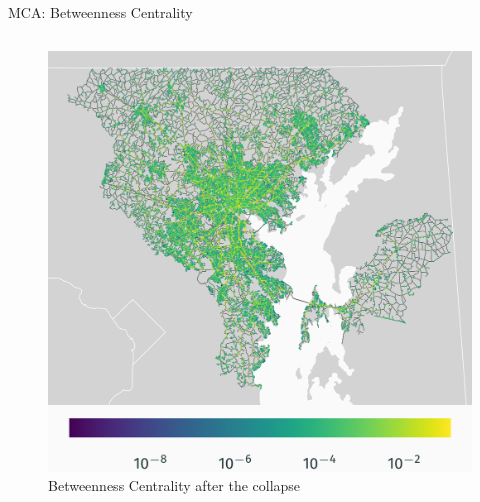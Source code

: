 \documentclass{beamer}
\numberwithin{figure}{section} %
\numberwithin{table}{section} %
\begin{document}
\begin{frame}{MCA: Betweenness Centrality}
\begin{columns}
        \begin{column}{0.33\textwidth}
            \begin{figure}
                \centering
                \includegraphics[width=\textwidth]{maps/betweenness_wo_bridge.png}
                {\scriptsize Betweenness Centrality after the collapse}
            \end{figure}
        \end{column}


\end{columns}
\end{frame}
\end{document}
